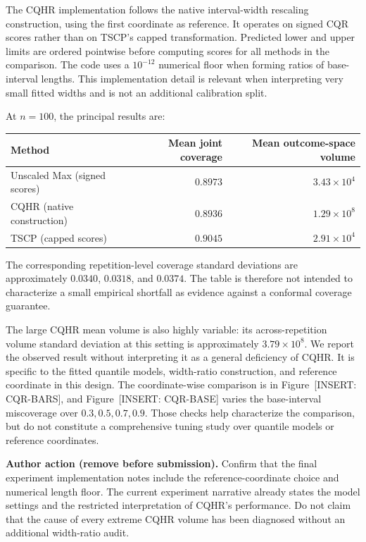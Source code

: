 \documentclass[11pt]{article}
\numberwithin{equation}{section}
\newcommand{\pending}[1]{\textcolor{AuthorRed}{[INSERT: #1]}}
\newcommand{\authoraction}[1]{%
  \par\begingroup\small\color{AuthorRed}%
  \textbf{Author action (remove before submission).} #1\par\endgroup}
\newcommand{\FigCQBars}{Figure~\pending{CQR-BARS}} %
\newcommand{\FigBase}{Figure~\pending{CQR-BASE}} %
\begin{document}
The CQHR implementation follows the native interval-width rescaling
construction, using the first coordinate as reference. It operates
on signed CQR scores rather than on TSCP's capped transformation.
Predicted lower and upper limits are ordered pointwise before
computing scores for all methods in the comparison.
The code uses a $10^{-12}$ numerical floor when forming ratios of
base-interval lengths. This implementation detail is relevant when
interpreting very small fitted widths and is not an additional
calibration split.

At $n=100$, the principal results are:
\begin{center}
\begin{tabular}{lrr}
\toprule
Method & Mean joint coverage & Mean outcome-space volume\\
\midrule
Unscaled Max (signed scores) & $0.8973$ & $3.43\times10^4$\\
CQHR (native construction) & $0.8936$ & $1.29\times10^8$\\
TSCP (capped scores) & $0.9045$ & $2.91\times10^4$\\
\bottomrule
\end{tabular}
\end{center}
The corresponding repetition-level coverage standard deviations are
approximately $0.0340$, $0.0318$, and $0.0374$. The table is therefore
not intended to characterize a small empirical shortfall as evidence
against a conformal coverage guarantee.

The large CQHR mean volume is also highly variable: its
across-repetition volume standard deviation at this setting is
approximately $3.79\times10^8$. We report the observed result without
interpreting it as a general deficiency of CQHR. It is specific to
the fitted quantile models, width-ratio construction, and reference
coordinate in this design. The coordinate-wise comparison is in
\FigCQBars{}, and \FigBase{} varies the base-interval miscoverage
over $0.3,0.5,0.7,0.9$. Those checks help characterize the comparison,
but do not constitute a comprehensive tuning study over quantile
models or reference coordinates.

\authoraction{Confirm that the final experiment implementation notes
include the reference-coordinate choice and numerical length floor.
The current experiment narrative already states the model settings
and the restricted interpretation of CQHR's performance. Do not
claim that the cause of every extreme CQHR volume has been diagnosed
without an additional width-ratio audit.}
\end{document}
